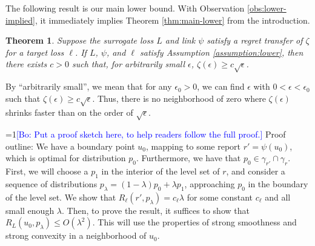 \documentclass{article}
\newtheorem{theorem}{Theorem}
\theoremstyle{definition}\newtheorem{definition}{Definition}
\theoremstyle{definition}\newtheorem{assumption}{Assumption}
\newcommand{\Comments}{1}
\newcommand{\mynote}[2]{\ifnum\Comments=1\textcolor{#1}{#2}\fi}
\newcommand{\bo}[1]{\mynote{blue}{[Bo: #1]}}
\begin{document}
The following result is our main lower bound.
With Observation \ref{obs:lower-implied}, it immediately implies Theorem \ref{thm:main-lower} from the introduction.
\begin{theorem}
  Suppose the surrogate loss $L$ and link $\psi$ satisfy a regret transfer of $\zeta$ for a target loss $\ell$.
  If $L$, $\psi$, and $\ell$ satisfy Assumption \ref{assumption:lower}, then there exists $c > 0$ such that, for arbitrarily small $\epsilon$, $\zeta(\epsilon) \geq c \sqrt{\epsilon}$.
\end{theorem}
By ``arbitrarily small'', we mean that for any $\epsilon_0 > 0$, we can find $\epsilon$ with $0 < \epsilon < \epsilon_0$ such that $\zeta(\epsilon) \geq c \sqrt{\epsilon}$.
Thus, there is no neighborhood of zero where $\zeta(\epsilon)$ shrinks faster than on the order of $\sqrt{\epsilon}$.

\bo{Put a proof sketch here, to help readers follow the full proof.}
Proof outline: We have a boundary point $u_0$, mapping to some report $r' = \psi(u_0)$, which is optimal for distribution $p_0$.
Furthermore, we have that $p_0 \in \gamma_{r'} \cap \gamma_r$.
First, we will choose a $p_1$ in the interior of the level set of $r$, and consider a sequence of distributions $p_{\lambda} = (1-\lambda) p_0 + \lambda p_1$, approaching $p_0$ in the boundary of the level set.
We show that $R_{\ell}(r', p_{\lambda}) = c_{\ell} \lambda$ for some constant $c_{\ell}$ and all small enough $\lambda$.
Then, to prove the result, it suffices to show that $R_L(u_0, p_{\lambda}) \leq O(\lambda^2)$.
This will use the properties of strong smoothness and strong convexity in a neighborhood of $u_0$.
\end{document}
